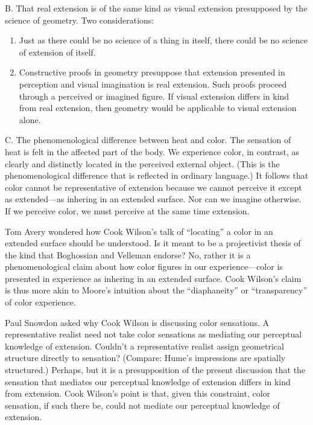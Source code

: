 \documentclass[11pt]{article}
\begin{document}
B. That real extension is of the same kind as visual extension presupposed by the science of geometry. Two considerations:
    \begin{enumerate}
    	\item Just as there could be no science of a thing in itself, there could be no science of extension of itself.
	    \item Constructive proofs in geometry presuppose that extension presented in perception and visual imagination is real extension. Such proofs proceed through a perceived or imagined figure. If visual extension differs in kind from real extension, then geometry would be applicable to visual extension alone.
    \end{enumerate}

C. The phenomenological difference between heat and color. The sensation of heat is felt in the affected part of the body. We experience color, in contrast, as clearly and distinctly located in the perceived external object. (This is the phenomenological difference that is reflected in ordinary language.) It follows that color cannot be representative of extension because we cannot perceive it except as extended---as inhering in an extended surface. Nor can we imagine otherwise. If we perceive color, we must perceive at the same time extension. %

    \begin{discussion}
        Tom Avery wondered how Cook Wilson's talk of ``locating'' a color in an extended surface should be understood. Is it meant to be a projectivist thesis of the kind that Boghossian and Velleman endorse? No, rather it is a phenomenological claim about how color figures in our experience---color is presented in experience as inhering in an extended surface. Cook Wilson's claim is thus more akin to Moore's intuition about the ``diaphaneity'' or ``transparency'' of color experience.
    
        Paul Snowdon asked why Cook Wilson is discussing color sensations. A representative realist need not take color sensations as mediating our perceptual knowledge of extension. Couldn't a representative realist assign geometrical structure directly to sensation? (Compare: Hume's impressions are spatially structured.) Perhaps, but it is a presupposition of the present discussion that the sensation that mediates our perceptual knowledge of extension differs in kind from extension. Cook Wilson's point is that, given this constraint, color sensation, if such there be, could not mediate our perceptual knowledge of extension.
    \end{discussion}
\end{document}
